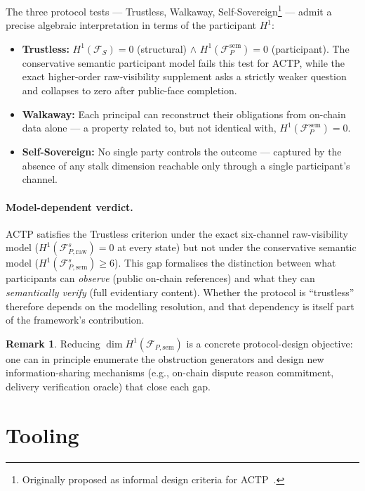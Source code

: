 \documentclass[11pt]{article}
\theoremstyle{plain}
\theoremstyle{definition}
\newtheorem{remark}[theorem]{Remark}
\newcommand{\Fsh}{\mathcal{F}}         %
\newcommand{\Hone}{H^{1}}
\newcommand{\dimn}{\operatorname{dim}}
\begin{document}
The three protocol tests --- Trustless, Walkaway, Self-Sovereign\footnote{Originally
proposed as informal design criteria for ACTP~\cite{AGIRAILSsdk}.} ---
admit a precise algebraic interpretation in terms of the participant $\Hone$:
\begin{itemize}
  \item \textbf{Trustless:} $\Hone(\Fsh_S) = 0$ (structural) $\wedge$
        $\Hone(\Fsh_P^{\mathrm{sem}}) = 0$ (participant).  The conservative semantic
        participant model fails this test for ACTP, while the exact
        higher-order raw-visibility supplement asks a strictly weaker
        question and collapses to zero after public-face completion.
  \item \textbf{Walkaway:} Each principal can reconstruct their obligations
        from on-chain data alone --- a property related to, but not identical
        with, $\Hone(\Fsh_P^{\mathrm{sem}}) = 0$.
  \item \textbf{Self-Sovereign:} No single party controls the outcome ---
        captured by the absence of any stalk dimension reachable only through
        a single participant's channel.
\end{itemize}

\paragraph{Model-dependent verdict.}
ACTP satisfies the Trustless criterion under the exact six-channel
raw-visibility model ($\Hone(\Fsh_{P,\mathrm{raw}}^s) = 0$ at every state)
but not under the conservative semantic model
($\Hone(\Fsh_{P,\mathrm{sem}}^s) \geq 6$).  This gap formalises the
distinction between what participants can \emph{observe} (public on-chain
references) and what they can \emph{semantically verify} (full evidentiary
content).  Whether the protocol is ``trustless'' therefore depends on the
modelling resolution, and that dependency is itself part of the framework's
contribution.

\begin{remark}
Reducing $\dimn\Hone(\Fsh_{P,\mathrm{sem}})$ is a concrete protocol-design
objective: one can in principle enumerate the obstruction generators and design
new information-sharing mechanisms (e.g., on-chain dispute reason commitment,
delivery verification oracle) that close each gap.
\end{remark}

\section{Tooling}
\label{sec:tooling}
\end{document}
